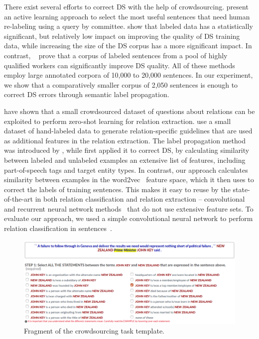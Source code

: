 There exist several efforts to correct DS with the help of crowdsourcing. \citet{angeli2014combining} present an active learning approach to select the most useful sentences that need human re-labeling using a query by committee. \citet{zhang2012big} show that labeled data has a statistically significant, but relatively low impact on improving the quality of DS training data, while increasing the size of the DS corpus has a more significant impact. In contrast, ~\citet{liu2016effective} prove that a corpus of labeled sentences from a pool of highly qualified workers can significantly improve DS quality. All of these methods employ large annotated corpora of 10,000 to 20,000 sentences. In our experiment, we show that a comparatively smaller corpus of 2,050 sentences is enough to correct DS errors through semantic label propagation.

\citet{levy2017zero} have shown that a small crowdsourced dataset of questions about relations can be exploited to perform zero-shot learning for relation extraction. \citet{pershina2014infusion} use a small dataset of hand-labeled data to generate relation-specific guidelines that are used as additional features in the relation extraction. The label propagation method was introduced by \citet{xiaojin2002learning}, while \citet{Chen:2006:REU:1220175.1220192} first applied it to correct DS, by calculating similarity between labeled and unlabeled examples an extensive list of features, including part-of-speech tags and target entity types. In contrast, our approach calculates similarity between examples in the word2vec~\cite{mikolov2013distributed} feature space, which it then uses to correct the labels of training sentences. This makes it easy to reuse by the state-of-the-art in both relation classification and relation extraction -- convolutional~\cite{ji2017distant} and recurrent neural network methods~\cite{zhou2016attention} that do not use extensive feature sets. To evaluate our approach, we used a simple convolutional neural network to perform relation classification in sentences~\cite{nguyen2015relation}. 

\begin{figure}[t!]
\centering
\includegraphics[width=\textwidth]{img/odrelex.png}
\caption{Fragment of the crowdsourcing task template.}
\label{fig:template}
\end{figure}

